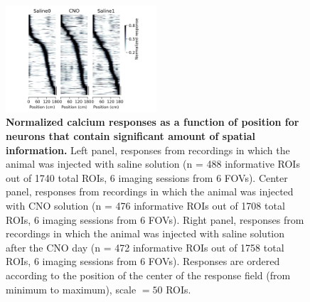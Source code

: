 \begin{figure}
    \centering
    \includegraphics[trim={110 20 180 20},clip,width=0.5\textwidth]{Figures/Chapter4/sal_cno_sig_snake_plots_long.png.pdf}
    \caption[Normalized calcium responses as a function of position for neurons that contain significant amount of spatial information]{\textbf{Normalized calcium responses as a function of position for neurons that contain significant amount of spatial information.} 
    Left panel, responses from recordings in which the animal was injected with saline solution (n = 488 informative ROIs out of 1740 total ROIs, 6 imaging sessions from 6 FOVs). 
    Center panel, responses from recordings in which the animal was injected with CNO solution (n = 476 informative ROIs out of 1708 total ROIs, 6 imaging sessions from 6 FOVs). 
    Right panel, responses from recordings in which the animal was injected with saline solution after the CNO day (n = 472 informative ROIs out of 1758 total ROIs, 6 imaging sessions from 6 FOVs). 
    Responses are ordered according to the position of the center of the response field (from minimum to maximum), scale $= 50$ ROIs.}
    \label{fig:chap4:snake_plots_long}
\end{figure}

